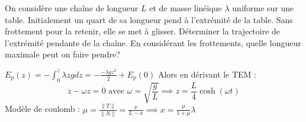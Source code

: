 \begin{Exercise}[title=]
	On considère une chaîne de longueur $L$ et de masse linéique $\lambda$ uniforme sur une table. Initialement un quart de sa longueur pend à l'extrémité de la table. Sans frottement pour la retenir, elle  se met à glisser.
	\Question  Déterminer la trajectoire de l'extrémité pendante de la chaîne.
	\Question En considérant les frottements, quelle longueur maximale peut on faire pendre?
\end{Exercise}
\begin{Answer}
	\Question $E_p(z) = -\int_{0}^{z}\lambda z g dz = -\frac{-\lambda g z^2}{2} + E_p(0)$
	Alors en dérivant le TEM :
	\[ \ddot{z} - \omega z = 0 \text{ avec } \omega = \sqrt{\frac{g}{L}} \implies z =\frac{L}{4}\cosh(\omega t) \]
	\Question Modèle de coulomb : $\mu = \frac{\|T\|}{\|N\|} = \frac{x}{L-x} \implies x= \frac{\mu}{1+\mu}\lambda $
\end{Answer}
